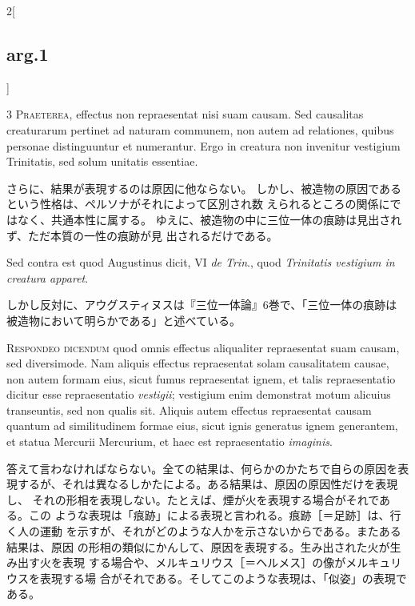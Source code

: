 \documentclass[paper=a4paper,fontsize=10pt,jafontsize=9pt,titlepage]{jlreq}
\begin{document}
\begin{paracol}{2}[\subsection{arg.1}]

{\scshape 3 Praeterea}, effectus non repraesentat nisi
 suam causam. Sed causalitas creaturarum pertinet ad naturam communem,
 non autem ad relationes, quibus personae distinguuntur et
 numerantur. Ergo in creatura non invenitur vestigium Trinitatis, sed
 solum unitatis essentiae.

\switchcolumn

さらに、結果が表現するのは原因に他ならない。
しかし、被造物の原因であるという性格は、ペルソナがそれによって区別され数
 えられるところの関係にではなく、共通本性に属する。
ゆえに、被造物の中に三位一体の痕跡は見出されず、ただ本質の一性の痕跡が見
 出されるだけである。

\switchcolumn*[\subsection{s.c.}]

Sed contra est quod Augustinus dicit, VI {\itshape de
 Trin}., quod {\itshape Trinitatis vestigium in creatura apparet}.

\switchcolumn

しかし反対に、アウグスティヌスは『三位一体論』6巻で、「三位一体の痕跡は
 被造物において明らかである」と述べている。


{\scshape Respondeo dicendum} quod omnis effectus
 aliqualiter repraesentat suam causam, sed diversimode. Nam aliquis
 effectus repraesentat solam causalitatem causae, non autem formam eius,
 sicut fumus repraesentat ignem, et talis repraesentatio dicitur esse
 repraesentatio {\itshape vestigii}; vestigium enim demonstrat motum alicuius
 transeuntis, sed non qualis sit. Aliquis autem effectus repraesentat
 causam quantum ad similitudinem formae eius, sicut ignis generatus
 ignem generantem, et statua Mercurii Mercurium, et haec est
 repraesentatio {\itshape imaginis}.

\switchcolumn

答えて言わなければならない。全ての結果は、何らかのかたちで自らの原因を表
現するが、それは異なるしかたによる。ある結果は、原因の原因性だけを表現し、
それの形相を表現しない。たとえば、煙が火を表現する場合がそれである。この
ような表現は「痕跡」による表現と言われる。痕跡［＝足跡］は、行く人の運動
を示すが、それがどのような人かを示さないからである。またある結果は、原因
の形相の類似にかんして、原因を表現する。生み出された火が生み出す火を表現
する場合や、メルキュリウス［＝ヘルメス］の像がメルキュリウスを表現する場
合がそれである。そしてこのような表現は、「似姿」の表現である。


\end{paracol}
\end{document}
